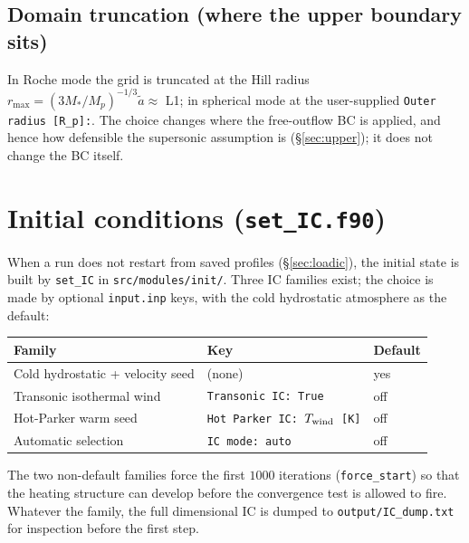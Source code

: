 \documentclass[english,a4paper]{kiseon_memo}
\begin{document}
\subsection{Domain truncation (where the upper boundary sits)}

In Roche mode the grid is truncated at the Hill radius
$r_{\max} = (3 M_*/M_p)^{-1/3}\tilde a \approx$ L1; in spherical mode
at the user-supplied \texttt{Outer radius [R\_p]:}. The choice changes
where the free-outflow BC is applied, and hence how defensible the
supersonic assumption is (\S\ref{sec:upper}); it does not change the
BC itself.

\section{Initial conditions (\texttt{set\_IC.f90})}
\label{sec:ic}

When a run does not restart from saved profiles
(\S\ref{sec:loadic}), the initial state is built by \texttt{set\_IC}
in \texttt{src/modules/init/}. Three IC families exist; the
choice is made by optional \texttt{input.inp} keys, with the cold
hydrostatic atmosphere as the default:

\begin{center}
\small
\begin{tabular}{@{}lll@{}}
\toprule
Family & Key & Default \\
\midrule
Cold hydrostatic + velocity seed & (none) & yes \\
Transonic isothermal wind & \texttt{Transonic IC: True} & off \\
Hot-Parker warm seed & \texttt{Hot Parker IC: $T_{\rm wind}$ [K]} & off \\
Automatic selection & \texttt{IC mode: auto} & off \\
\bottomrule
\end{tabular}
\end{center}

The two non-default families force the first $1000$ iterations
(\texttt{force\_start}) so that the heating structure can develop
before the convergence test is allowed to fire. Whatever the family,
the full dimensional IC is dumped to \texttt{output/IC\_dump.txt} for
inspection before the first step.
\end{document}
